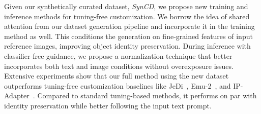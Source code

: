 Given our synthetically curated dataset, \emph{SynCD}, we propose new training and inference methods for tuning-free customization. We borrow the idea of shared attention from our dataset generation pipeline and incorporate it in the training method as well. This conditions the generation on fine-grained features of input reference images, improving object identity preservation. During inference with classifier-free guidance, we propose a normalization technique that better incorporates both text and image conditions without overexposure issues. Extensive experiments show that our full method using the new dataset outperforms  tuning-free customization baselines like JeDi~\cite{zeng2024jedi}, Emu-2~\cite{Emu2}, and IP-Adapter~\cite{ye2023ip}. Compared to standard tuning-based methods, it performs on par with identity preservation while better following the input text prompt.





